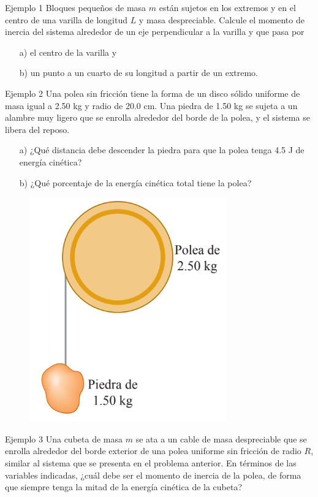 \begin{frame}{Ejemplo 1}
    Bloques pequeños de masa $m$ están sujetos en los extremos y en el centro de una varilla de longitud $L$ y masa despreciable. Calcule el momento de inercia del sistema alrededor de un eje perpendicular a la varilla y que pasa por
    
    \begin{itemize}
        \item[a)] el centro de la varilla y
        \item[b)] un punto a un cuarto de su longitud a partir de un extremo.
    \end{itemize}
\end{frame}

\begin{frame}{Ejemplo 2}
    Una polea sin fricción tiene la forma de un disco sólido uniforme de masa igual a 2.50 kg y radio de 20.0 cm. Una piedra de 1.50 kg se sujeta a un alambre muy ligero que se enrolla alrededor del borde de la polea, y el sistema se libera del reposo.
    \begin{itemize}
        \item[a)] ¿Qué distancia debe descender la piedra para que la polea tenga 4.5 J de energía cinética?
        \item[b)] ¿Qué porcentaje de la energía cinética total tiene la polea?
    \end{itemize}

    \begin{figure}
        \centering
        \includegraphics[width=0.3\linewidth]{figures/polea-roca.png}
    \end{figure}
    
\end{frame}

\begin{frame}{Ejemplo 3}
    Una cubeta de masa $m$ se ata a un cable de masa despreciable que se enrolla alrededor del borde exterior de una polea uniforme sin fricción de radio $R$, similar al sistema que se presenta en el problema anterior. En términos de las variables indicadas, ¿cuál debe ser el momento de inercia de la polea, de forma que siempre tenga la mitad de la energía cinética de la cubeta?
\end{frame}

